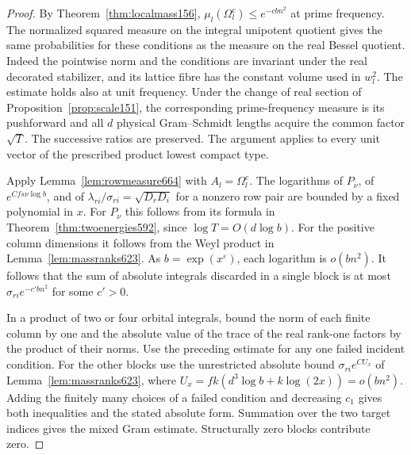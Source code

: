 \documentclass[a4paper,11pt]{article}
\theoremstyle{definition}
\theoremstyle{remark}
\numberwithin{equation}{section}
\begin{document}
\begin{proof}
By Theorem~\ref{thm:localmass156},
\(\mu_l(\Omega_l^c)\le e^{-c b n^2}\) at prime frequency.
The normalized squared measure on the integral unipotent quotient
gives the same probabilities for these conditions as the measure
on the real Bessel quotient. Indeed the pointwise norm and the
conditions are invariant under the real decorated stabilizer,
and its lattice fibre has the constant volume used in \(w_l^2\).
The estimate holds also at unit frequency. Under the change
of real section of Proposition~\ref{prop:scale151}, the
corresponding prime-frequency measure is its pushforward and
all \(d\) physical Gram--Schmidt lengths acquire the common
factor \(\sqrt T\). The successive ratios are preserved. The
argument applies to every unit vector of the prescribed product
lowest compact type.

Apply Lemma~\ref{lem:rowmeasure664} with \(A_l=\Omega_l^c\).
The logarithms of \(P_\nu\), of \(e^{Cfs\nu\log b}\), and of
\(\lambda_{ri}/\sigma_{ri}=\sqrt{D_rD_i}\) for a nonzero
row pair are bounded by a fixed polynomial in \(x\).
For \(P_\nu\) this follows from its formula in
Theorem~\ref{thm:twoenergies592}, since \(\log T=O(d\log b)\).
For the positive column dimensions it follows from the Weyl
product in Lemma~\ref{lem:massranks623}. As \(b=\exp(x^\varepsilon)\),
each logarithm is \(o(bn^2)\). It follows that the sum of
absolute integrals discarded in a single block is at most
\(\sigma_{ri}e^{-c'bn^2}\) for some \(c'>0\).

In a product of two or four orbital integrals, bound the norm of
each finite column by one and the absolute value of the trace
of the real rank-one factors by the product of their norms.
Use the preceding estimate for any one failed incident condition.
For the other blocks use the unrestricted absolute bound
\(\sigma_{ri}e^{C U_x}\) of Lemma~\ref{lem:massranks623},
where \(U_x=fk(d^3\log b+k\log(2x))=o(bn^2)\).
Adding the finitely many choices of a failed condition and
decreasing \(c_1\) gives both inequalities and the stated
absolute form. Summation over the two target indices gives the
mixed Gram estimate. Structurally zero blocks contribute zero.
\end{proof}
\end{document}
